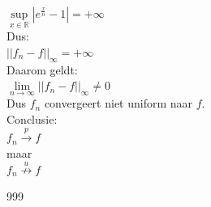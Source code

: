 \documentclass[a4paper]{article}
\begin{document}
$ \sup\limits_{x\in\mathbb{R}}\left|e^{\tfrac{x}{n}}-1\right|=+\infty $ \\

Dus: \\

$ \left|\left|f_n-f\right|\right|_{\infty}=+\infty $ \\

Daarom geldt: \\

$ \lim\limits_{n\rightarrow\infty}\left|\left|f_n-f\right|\right|_{\infty}\neq 0 $ \\

Dus $f_n$ convergeert niet uniform naar $f$. \\

Conclusie: \\

$ f_n \stackrel{p}{\rightarrow} f $ \\

maar \\

$ f_n \stackrel{u}{\not\rightarrow} f $ \\

\begin{thebibliography}{999}
\end{thebibliography}
\end{document}
